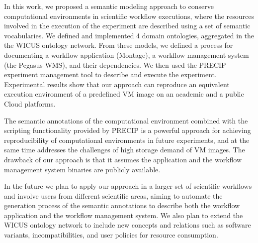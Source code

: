 
In this work, we proposed a semantic modeling approach to conserve computational environments in scientific workflow executions, where  the resources involved in the execution of the experiment are described using a set of semantic vocabularies. We defined and implemented 4 domain ontologies, aggregated in the the WICUS ontology network. From these models, we defined a process for documenting a workflow application (Montage), a workflow management system (the Pegasus WMS), and their dependencies. We then used the PRECIP experiment management tool to describe and execute the experiment. Experimental results show that our approach can reproduce an equivalent execution environment of a predefined VM image on an academic and a public Cloud platforms.

The semantic annotations of the computational environment combined with the scripting functionality provided by PRECIP is a powerful approach for achieving reproducibility of computational environments in future experiments, and at the same time addresses the challenges of high storage demand of VM images. The drawback of our approach is that it assumes the application and the workflow management system binaries are publicly available.

In the future we plan to apply our approach in a larger set of scientific workflows and involve users from different scientific areas, aiming to automate the generation process of the semantic annotations to describe both the workflow application and the workflow management system. We also plan to extend the WICUS ontology network to include new concepts and relations such as software variants, incompatibilities, and user policies for resource consumption.